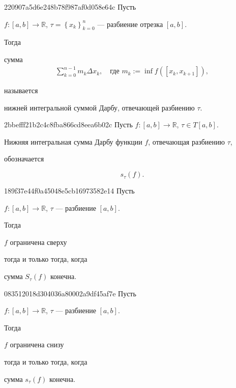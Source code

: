 \begin{note}{220907a5d6e248b78f987af0d058e64c}
    Пусть \begin{icloze}{3}\({ f : [a, b] \to \mathbb R }\), \({ \tau = \left\{ x_k \right\}_{k = 0}^{n} }\) --- разбиение отрезка \({ [a, b] }\).\end{icloze}
    Тогда \begin{icloze}{1}сумма
    \[
        \begin{gathered}
            \displaystyle \sum_{k=0}^{n - 1} m_k \Delta x_k, \quad \text{где \({ m_k := \inf f([x_k, x_{k + 1}]) }\)},
        \end{gathered}
    \]\end{icloze}
    называется \begin{icloze}{2}нижней интегральной суммой Дарбу, отвечающей разбиению \({ \tau }\).\end{icloze}
\end{note}

\begin{note}{2bbefff21b2c4c8fba866cd8eea6b02c}
    Пусть \({ f : [a, b] \to \mathbb R }\), \({ \tau \in T[a, b] }\).
    \begin{icloze}{1}Нижняя интегральная сумма Дарбу функции \({ f }\), отвечающая разбиению \({ \tau }\),\end{icloze} обозначается
    \begin{icloze}{2}
        \[
            s_\tau (f).
        \]
    \end{icloze}
\end{note}

\begin{note}{189f37e44f0a45048e5cb16973582e14}
    Пусть \begin{icloze}{4}\({ f : [a, b] \to \mathbb R }\), \({ \tau }\) --- разбиение \({ [a, b] }\).\end{icloze}
    Тогда \begin{icloze}{2}\({ f }\) ограничена сверху\end{icloze} \begin{icloze}{3}тогда и только тогда, когда\end{icloze} \begin{icloze}{1}сумма \({ S_\tau (f) }\) конечна.\end{icloze}
\end{note}

\begin{note}{083512018d304036a80002a9df45af7e}
    Пусть \begin{icloze}{4}\({ f : [a, b] \to \mathbb R }\), \({ \tau }\) --- разбиение \({ [a, b] }\).\end{icloze}
    Тогда \begin{icloze}{2}\({ f }\) ограничена снизу\end{icloze} \begin{icloze}{3}тогда и только тогда, когда\end{icloze} \begin{icloze}{1}сумма \({ s_\tau (f) }\) конечна.\end{icloze}
\end{note}

